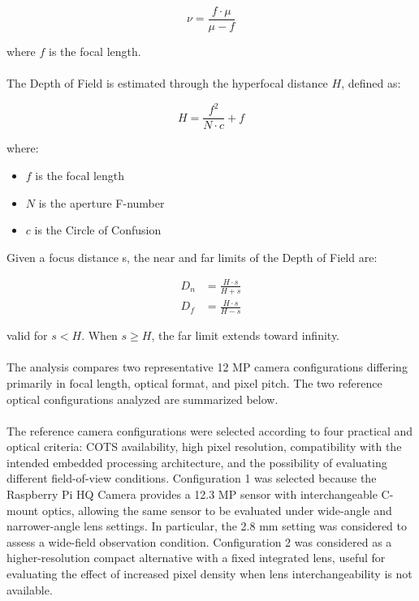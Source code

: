 \begin{equation}
\nu = \frac{f \cdot \mu}{\mu - f}
\label{eq:focal-relation}
\end{equation}

where $f$ is the focal length.
\\\\
The Depth of Field is estimated through the hyperfocal distance $H$, defined as:

\begin{equation}
H = \frac{f^2}{N \cdot c} + f
\label{eq:hyperfocal-distance}
\end{equation}

where:
\begin{itemize}
    \item $f$ is the focal length
    \item $N$ is the aperture F-number
    \item $c$ is the Circle of Confusion
\end{itemize}

Given a focus distance s, the near and far limits of the Depth of Field are:

\begin{subequations}
\label{eq:depth-of-field}
\begin{align}
D_n &= \frac{H \cdot s}{H + s}
\label{eq:near-distance} \\[4pt]
D_f &= \frac{H \cdot s}{H - s}
\label{eq:far-distance}
\end{align}
\end{subequations}

valid for $s < H$. When $s \geq H$, the far limit extends toward infinity.
\\\\
The analysis compares two representative 12 MP camera configurations differing primarily in focal length, optical format, and pixel pitch. The two reference optical configurations analyzed are summarized below.
\\\\
The reference camera configurations were selected according to four practical and optical criteria: COTS availability, high pixel resolution, compatibility with the intended embedded processing architecture, and the possibility of evaluating different field-of-view conditions. Configuration 1 was selected because the Raspberry Pi HQ Camera provides a 12.3 MP sensor with interchangeable C-mount optics, allowing the same sensor to be evaluated under wide-angle and narrower-angle lens settings. In particular, the 2.8 mm setting was considered to assess a wide-field observation condition. Configuration 2 was considered as a higher-resolution compact alternative with a fixed integrated lens, useful for evaluating the effect of increased pixel density when lens interchangeability is not available.

